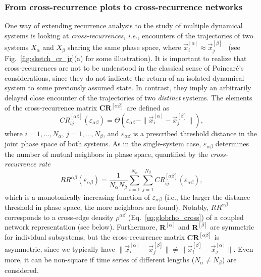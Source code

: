 		\subsubsection{From cross-recurrence plots to cross-recurrence networks}
        		One way of extending recurrence analysis to the study of multiple dynamical systems is looking at \emph{cross-recurrences}, \textit{i.e.}, encounters of the trajectories of two systems $X_\alpha$ and $X_\beta$ sharing the same phase space, where $\vec{x}_i^{[\alpha]} \approx \vec{x}_j^{[\beta]}$~\cite{marwan2002,Zbilut1998} (see Fig.~\ref{fig:sketch_cr_jr}(a) for some illustration). It is important to realize that cross-recurrences are not to be understood in the classical sense of Poincar{\'e}'s considerations, since they do not indicate the return of an isolated dynamical system to some previously assumed state. In contrast, they imply an arbitrarily delayed close encounter of the trajectories of two \emph{distinct} systems. The elements of the cross-recurrence matrix $\mathbf{CR}^{[\alpha\beta]}$ are defined as
\begin{equation}
CR_{ij}^{[\alpha\beta]}(\varepsilon_{\alpha\beta})=\Theta(\varepsilon_{\alpha\beta} - \| \vec{x}_{i}^{[\alpha]} - \vec{x}_{j}^{[\beta]} \|),
\end{equation}
where $i=1,\dots,N_\alpha$, $j=1,\dots,N_\beta$, and $\varepsilon_{\alpha\beta}$ is a prescribed threshold distance in the joint phase space of both systems. As in the single-system case, $\varepsilon_{\alpha\beta}$ determines the number of mutual neighbors in phase space, quantified by the \emph{cross-recurrence rate}
\begin{equation}
RR^{\alpha\beta}(\varepsilon_{\alpha\beta})=\frac{1}{N_\alpha N_\beta}\sum_{i=1}^{N_\alpha} \sum_{j=1}^{N_\beta} CR_{ij}^{[\alpha\beta]}(\varepsilon_{\alpha\beta}),
\label{eq:crr}
\end{equation}
\noindent
which is a monotonically increasing function of $\varepsilon_{\alpha\beta}$ (i.e., the larger the distance threshold in phase space, the more neighbors are found). Notably, $RR^{\alpha\beta}$ corresponds to a cross-edge density ${\rho}^{\alpha\beta}$ (Eq.~\ref{eq:globrho_cross}) of a coupled network representation (see below). Furthermore, $\mathbf{R}^{[\alpha]}$ and $\mathbf{R}^{[\beta]}$ are symmetric for individual subsystems, but the cross-recurrence matrix $\mathbf{CR}^{[\alpha\beta]}$ is asymmetric, since we typically have $\|\vec{x}_i^{[\alpha]} - \vec{x}_j^{[\beta]}\|\neq\|\vec{x}_i^{[\beta]} - \vec{x}_j^{[\alpha]}\|$. Even more, it can be non-square if time series of different lengths ($N_\alpha\neq N_\beta$) are considered.
